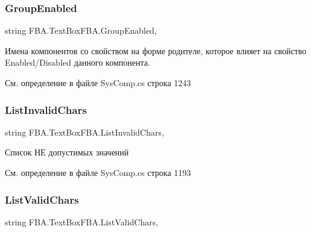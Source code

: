 \subsubsection{\texorpdfstring{Group\+Enabled}{GroupEnabled}}
{\footnotesize\ttfamily string F\+B\+A.\+Text\+Box\+F\+B\+A.\+Group\+Enabled\hspace{0.3cm}{\ttfamily [get]}, {\ttfamily [set]}}



Имена компонентов со свойством на форме родителе, которое влияет на свойство Enabled/\+Disabled данного компонента. 



См. определение в файле Sys\+Comp.\+cs строка 1243

\mbox{\label{class_f_b_a_1_1_text_box_f_b_a_a8bf6d4061e258fab5f0f54ac603b87e6}} 
\subsubsection{\texorpdfstring{List\+Invalid\+Chars}{ListInvalidChars}}
{\footnotesize\ttfamily string F\+B\+A.\+Text\+Box\+F\+B\+A.\+List\+Invalid\+Chars\hspace{0.3cm}{\ttfamily [get]}, {\ttfamily [set]}}



Список НЕ допустимых значений 



См. определение в файле Sys\+Comp.\+cs строка 1193

\mbox{\label{class_f_b_a_1_1_text_box_f_b_a_a29388e3f720f0c1de61acb627e0f8b44}} 
\subsubsection{\texorpdfstring{List\+Valid\+Chars}{ListValidChars}}
{\footnotesize\ttfamily string F\+B\+A.\+Text\+Box\+F\+B\+A.\+List\+Valid\+Chars\hspace{0.3cm}{\ttfamily [get]}, {\ttfamily [set]}}



